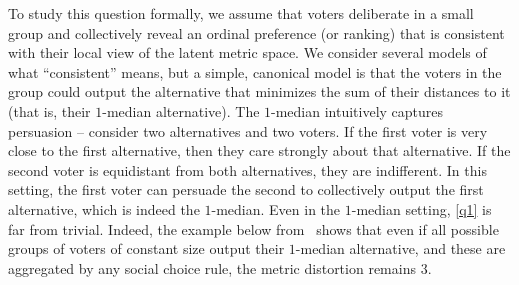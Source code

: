 

To study this question formally,  we assume that voters deliberate in a small group and collectively reveal an ordinal preference (or ranking) that is consistent with their local view of the latent metric space. We consider several models of what ``consistent'' means, but a simple, canonical model is that the voters in the group could output the alternative that minimizes the sum of their distances to it (that is, their $1$-median alternative). The $1$-median intuitively captures persuasion -- consider two alternatives and two voters. If the first voter is very close to the first alternative, then they care strongly about that alternative. If the second voter is equidistant from both alternatives, they are indifferent. In this setting, the first voter can persuade the second to collectively output the first alternative, which is indeed the $1$-median. Even in the $1$-median setting, \cref{q1} is far from trivial. Indeed, the example below from~\cite{FainGMS17,CaragiannisM024} shows that even if all possible groups of voters of constant size output their $1$-median alternative, and these are aggregated by any social choice rule, the metric distortion remains $3$.


